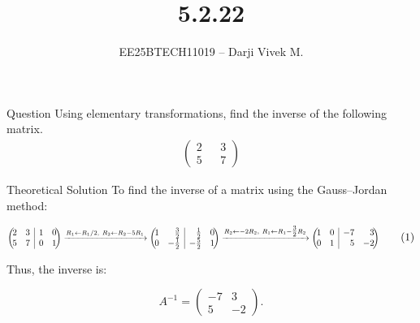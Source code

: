 \documentclass{beamer}
\title{5.2.22}
\author{EE25BTECH11019 -- Darji Vivek M.}
\date{}
\makeatletter
\newcommand{\myvec}[1]{\begin{pmatrix}#1\end{pmatrix}}
\newcommand{\augvec}[3]{%
  \left(\!\begin{array}{@{}*{#1}{r}|*{#2}{r}@{}}#3\end{array}\!\right)
}
\makeatother
\begin{document}
\begin{frame}
\begin{titlepage}

\end{titlepage}
\end{frame}

\begin{frame}{Question}
Using elementary transformations, find the inverse of the following matrix. 
\begin{align*}
    \myvec{2&&3\\5&&7}
\end{align*}
\end{frame}

\begin{frame}{Theoretical Solution}
To find the inverse of a matrix using the Gauss–Jordan method:

\begin{equation}
\resizebox{1\textwidth}{!}{$
\augvec{2}{2}{2 & 3 & 1 & 0\\ 5 & 7 & 0 & 1}
\xrightarrow{R_1 \gets R_1/2,\ R_2 \gets R_2 - 5 R_1}
\augvec{2}{2}{1 & \tfrac{3}{2} & \tfrac{1}{2} & 0\\ 0 & -\tfrac{1}{2} & -\tfrac{5}{2} & 1}
\xrightarrow{R_2 \gets -2 R_2,\ R_1 \gets R_1 - \tfrac{3}{2} R_2}
\augvec{2}{2}{1 & 0 & -7 & 3\\ 0 & 1 & 5 & -2}
$}
\tag{1}
\end{equation}

Thus, the inverse is:

\begin{equation}
A^{-1} =
\myvec{-7 & 3\\ 5 & -2}.
\tag{2}
\end{equation}
\end{frame}
\end{document}
